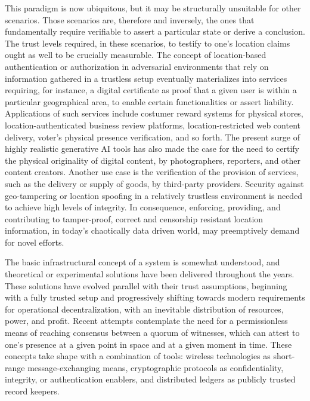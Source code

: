 This paradigm is now ubiquitous, but it may be structurally unsuitable for other scenarios. Those scenarios are, therefore and inversely, the ones that fundamentally require verifiable \pol{} to assert a particular state or derive a conclusion. The trust levels required, in these scenarios, to testify to one's location claims ought as well to be crucially measurable. The concept of location-based authentication or authorization in adversarial environments that rely on information gathered in a trustless setup eventually materializes into services requiring, for instance, a digital certificate as proof that a given user is within a particular geographical area, to enable certain functionalities or assert liability. Applications of such services include costumer reward systems for physical stores, location-authenticated business review platforms, location-restricted web content delivery, voter's physical presence verification, and so forth. The present surge of highly realistic generative AI tools has also made the case for the need to certify the physical originality of digital content, by photographers, reporters, and other content creators. Another use case is the verification of the provision of services, such as the delivery or supply of goods, by third-party providers. Security against geo-tampering or location spoofing in a relatively trustless environment is needed to achieve high levels of integrity. In consequence, enforcing, providing, and contributing to tamper-proof, correct and censorship resistant location information, in today's chaotically data driven world, may preemptively demand for novel efforts. 

The basic infrastructural concept of a \pol{} system is somewhat understood, and theoretical or experimental solutions have been delivered throughout the years. These solutions have evolved parallel with their trust assumptions, beginning with a fully trusted setup and progressively shifting towards modern requirements for operational decentralization, with an inevitable distribution of resources, power, and profit. Recent attempts contemplate the need for a permissionless means of reaching consensus between a quorum of witnesses, which can attest to one's presence at a given point in space and at a given moment in time. These concepts take shape with a combination of tools: wireless technologies as short-range message-exchanging means, cryptographic protocols as confidentiality, integrity, or authentication enablers, and distributed ledgers as publicly trusted record keepers. 

